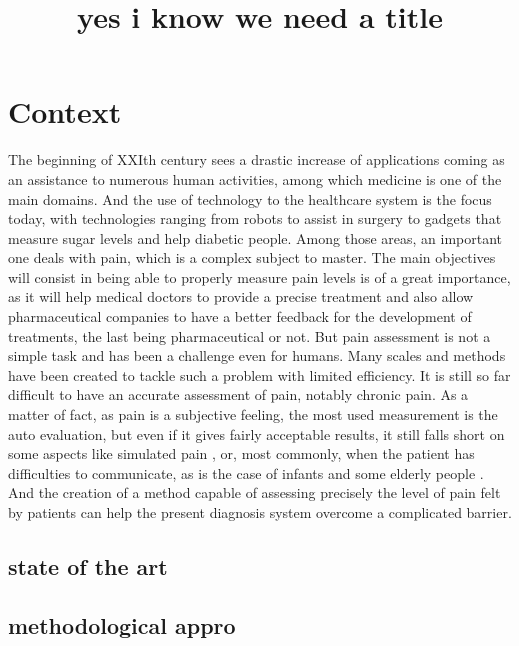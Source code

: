 \documentclass[11pt]{article}
\date{}
\title{yes i know we need a title}
\begin{document}
\maketitle

\section{Context}
\label{sec:orgfcdfbb1}
 The beginning of XXIth century sees a drastic increase of applications coming as an assistance to numerous human activities,
 among which medicine is one of the main domains. And the use of technology to the healthcare system is the focus today, with
 technologies ranging from robots to assist in surgery to gadgets that measure sugar levels and help diabetic people.
 Among those areas, an important one deals with pain, which is a complex subject to master. The main objectives will consist in
 being able to properly measure pain levels is of a great importance, as it will help medical doctors to provide a precise treatment
 and also allow pharmaceutical companies to  have a better feedback for the development of treatments, the last being pharmaceutical or not.
 But pain assessment is not a simple task and has been a challenge even for humans. Many scales and methods have been created to tackle
such a problem \cite{wong1996wong,mccaffery1999pain,portenoy1996visual,melzack1975mcgill,galer1997development,gracely1988descriptor} with
limited efficiency. It is still so far difficult to  have an accurate assessment of pain, notably chronic pain.
 As a matter of fact, as pain is a subjective feeling, the most used measurement is the auto evaluation, but even if it gives fairly acceptable
results, it still falls short on some aspects like simulated pain \cite{gwen2007faces}, or, most commonly, when the patient has difficulties to
communicate, as is the case of infants and some elderly people \cite{lucey2011automatically}.
 And the creation of a method capable of assessing precisely the level of pain felt by patients can help the present diagnosis system overcome
a complicated barrier.


\subsection{state of the art}
\label{sec:org427a2f8}



\subsection{methodological appro}
\label{sec:org36dbbd7}
\end{document}
